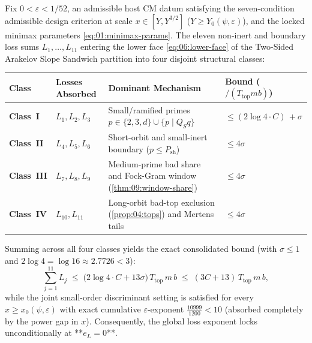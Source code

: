 \begin{theorem}[Four-class consolidation of all eleven loss sums ($e_L = 0$)]
\label{thm:10:four-class-losses}
Fix $0 < \varepsilon < 1/52$, an admissible host CM datum satisfying the seven-condition admissible design criterion at scale $x \in [Y, Y^{3/2}]$ ($Y \ge Y_0(\psi, \varepsilon)$), and the locked minimax parameters \eqref{eq:01:minimax-params}. The eleven non-inert and boundary loss sums $L_1, \dots, L_{11}$ entering the lower face \eqref{eq:06:lower-face} of the Two-Sided Arakelov Slope Sandwich partition into four disjoint structural classes:
\begin{center}
\renewcommand{\arraystretch}{1.15}
\small
\begin{tabular}{@{}llll@{}}
\toprule
\textbf{Class} & \textbf{Losses Absorbed} & \textbf{Dominant Mechanism} & \textbf{Bound ($/ (T_{\mathrm{top}} m b)$)} \\
\midrule
\textbf{Class~I} & $L_1, L_2, L_3$ & Small/ramified primes $p \in \{2,3,d\} \cup \{p \mid Q_S q\}$ & $\le (2\log 4 \cdot C)\, + \sigma$ \\
\textbf{Class~II} & $L_4, L_5, L_6$ & Short-orbit and small-inert boundary ($p \le P_{\mathrm{sh}}$) & $\le 4\sigma$ \\
\textbf{Class~III} & $L_7, L_8, L_9$ & Medium-prime bad share and Fock-Gram window (\cref{thm:09:window-share}) & $\le 4\sigma$ \\
\textbf{Class~IV} & $L_{10}, L_{11}$ & Long-orbit bad-top exclusion (\cref{prop:04:tops}) and Mertens tails & $\le 4\sigma$ \\
\bottomrule
\end{tabular}
\end{center}
Summing across all four classes yields the exact consolidated bound (with $\sigma \le 1$ and $2\log 4 = \log 16 \approx 2.7726 < 3$):
\begin{equation}
\label{eq:10:eleven-sum}
  \sum_{j = 1}^{11} L_j
  \;\le\; \bigl(2\log 4 \cdot C + 13\sigma\bigr)\, T_{\mathrm{top}}\, m\, b
  \;\le\; (3 C + 13)\, T_{\mathrm{top}}\, m\, b,
\end{equation}
while the joint small-order discriminant setting is satisfied for every $x \ge x_0(\psi, \varepsilon)$ with exact cumulative $\varepsilon$-exponent $\frac{10999}{1200} < 10$ (absorbed completely by the power gap in $x$). Consequently, the global loss exponent locks unconditionally at **$e_L = 0$**.
\end{theorem}

